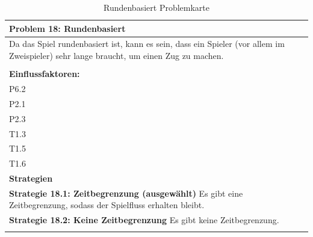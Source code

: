 \documentclass[fontsize=12pt,paper=a4,twoside]{scrartcl}
\begin{document}
\begin{table}[H]
    \centering
    \begin{tabular}{|p{15cm}|}
    \hline
          \textbf{Problem 18: Rundenbasiert}  \\ \hline
	Da das Spiel rundenbasiert ist, kann es sein, dass ein Spieler (vor allem im Zweispieler) sehr lange braucht, um einen Zug zu machen. \\
         \\ \hline
          \textbf{Einflussfaktoren: } \\
	P6.2 \\
	P2.1 \\
	P2.3 \\
	T1.3 \\
	T1.5 \\
	T1.6 \\
          \hline
          \textbf{Strategien} \\ \hline
            {}          
           \label{strategie:18.1}     
          \textbf{Strategie 18.1: Zeitbegrenzung (ausgewählt)} Es gibt eine Zeitbegrenzung, sodass der Spielfluss erhalten bleibt.   \\        
  {}          
           \label{strategie:18.2}              
          \textbf{Strategie 18.2: Keine Zeitbegrenzung} Es gibt keine Zeitbegrenzung. \\
	 \\ \hline
    \end{tabular}

    \caption{Rundenbasiert Problemkarte}
    \label{tab:ProblemKarte18}
\end{table}
\end{document}

